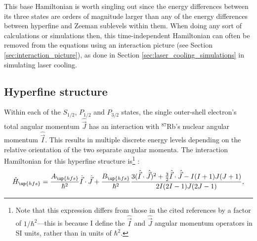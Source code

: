 This base Hamiltonian is worth singling out since the energy differences between its three states are orders of magnitude larger than any of the energy differences between hyperfine and Zeeman sublevels within them. When doing any sort of calculations or simulations then, this time-independent Hamiltonian can often be removed from the equations using an interaction picture (see Section \ref{sec:interaction_picture}), as done in Section \ref{sec:laser_cooling_simulations} in simulating laser cooling. 

\subsection{Hyperfine structure}\label{sec:hyperfine_structure}

Within each of the $S_{1/2}$, $P_{1/2}$ and $P_{3/2}$ states, the single outer-shell electron's total angular momentum $\hat {\vec J}$ has an interaction with $^{87}$Rb's nuclear angular momentum $\hat{\vec I}$. This results in multiple discrete energy levels depending on the relative orientation of the two separate angular momenta. The interaction Hamiltonian for this hyperfine structure is\footnote{Note that this expression differs from those in the cited references by a factor of $1/\hbar^2$---this is because I define the $\hat{\vec I}$ and $\hat{\vec J}$ angular momentum operators in SI units, rather than in units of $\hbar^2$.} \cite{steck_rubidium_2015, arimondo_experimental_1977}:
\begin{align}\label{eq:H_hfs}
\hat H_\up{hfs} = \frac{A_\up{hfs}}{\hbar^2} \hat{\vec I} \cdot \hat {\vec J}
+ \frac{B_\up{hfs}}{\hbar^2}\frac
{3(\hat{\vec I}\cdot\hat{\vec J})^2 + \frac32 \hat{\vec I}\cdot\hat{\vec J} - I(I + 1)J(J + 1)}
{2I(2I - 1)J(2J - 1)},
\end{align}
